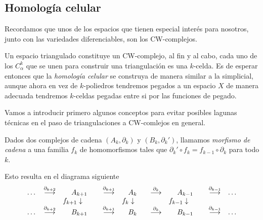  \bigskip

\subsection{Homología celular}
\label{subsec:homcelular}
 Recordamos que unos de los espacios que tienen especial interés para nosotros, junto con las variedades diferenciables, son los CW-complejos. 
 

 Un espacio triangulado constituye un CW-complejo, al fin y al cabo, cada uno de los $C^k_{\alpha}$ que se unen para construir una triangulación es una $k$-celda. Es de esperar entonces que la \textit{homología celular} se construya de manera similar a la simplicial, aunque ahora en vez de $k$-poliedros tendremos pegados a un espacio $X$ de manera adecuada tendremos $k$-celdas pegadas entre si por las funciones de pegado.
 
Vamos a introducir primero algunos conceptos para evitar posibles lagunas técnicas en el paso de triangulaciones a CW-comlejos en general.

 \begin{definition}
    Dados dos complejos de cadena $(A_k, \partial_k)$ y $(B_k, \partial_k')$, llamamos \textit{morfismo de cadena} a una familia $f_k$ de homomorfismos tales que $\partial_k'\circ f_k = f_{k-1}\circ \partial_k$ para todo $k$.
 \end{definition}

 Esto resulta en el diagrama siguiente
 \[
 \begin{array}{ccccccccc}
    \dots & \overset{\partial_{k+2}}{\longrightarrow} & A_{k+1} & \overset{\partial_{k+1}}{\longrightarrow} & A_{k} & \overset{\partial_{k}}{\longrightarrow} & A_{k-1} & \overset{\partial_{k-1}}{\longrightarrow} & \dots \\
    & & f_{k+1} \huge\downarrow  ~~~ & & f_k \huge\downarrow ~~ & & f_{k-1} \huge\downarrow ~~~ & & \\
    \dots & \overset{\partial_{k+2}}{\longrightarrow} & B_{k+1} & \overset{\partial_{k+1}}{\longrightarrow} & B_{k} & \overset{\partial_{k}}{\longrightarrow} & B_{k-1} & \overset{\partial_{k-1}}{\longrightarrow} & \dots
 \end{array}
\]

